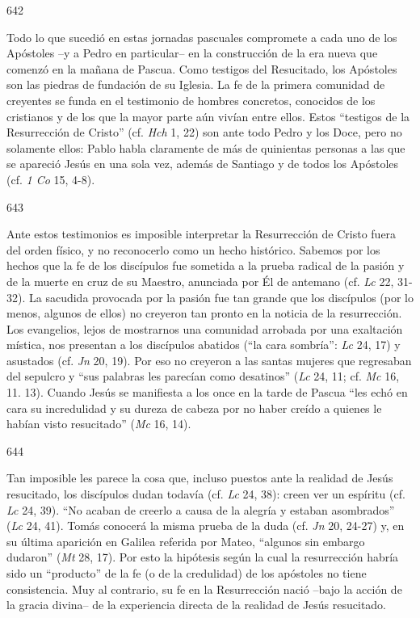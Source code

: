 			\begin{ccebody}\begin{ccenumber}642\end{ccenumber} Todo lo que sucedió en estas jornadas pascuales compromete a cada uno de los Apóstoles –y a Pedro en particular– en la construcción de la era nueva que comenzó en la mañana de Pascua. Como testigos del Resucitado, los Apóstoles son las piedras de fundación de su Iglesia. La fe de la primera comunidad de creyentes se funda en el testimonio de hombres concretos, conocidos de los cristianos y de los que la mayor parte aún vivían entre ellos. Estos “testigos de la Resurrección de Cristo” (cf. \textit{Hch} 1, 22) son ante todo Pedro y los Doce, pero no solamente ellos: Pablo habla claramente de más de quinientas personas a las que se apareció Jesús en una sola vez, además de Santiago y de todos los Apóstoles (cf. \textit{1 Co} 15, 4-8).\end{ccebody}
			
			\begin{ccebody}\begin{ccenumber}643\end{ccenumber} Ante estos testimonios es imposible interpretar la Resurrección de Cristo fuera del orden físico, y no reconocerlo como un hecho histórico. Sabemos por los hechos que la fe de los discípulos fue sometida a la prueba radical de la pasión y de la muerte en cruz de su Maestro, anunciada por Él de antemano (cf. \textit{Lc} 22, 31-32). La sacudida provocada por la pasión fue tan grande que los discípulos (por lo menos, algunos de ellos) no creyeron tan pronto en la noticia de la resurrección. Los evangelios, lejos de mostrarnos una comunidad arrobada por una exaltación mística, nos presentan a los discípulos abatidos (“la cara sombría”: \textit{Lc} 24, 17) y asustados (cf. \textit{Jn} 20, 19). Por eso no creyeron a las santas mujeres que regresaban del sepulcro y “sus palabras les parecían como desatinos” (\textit{Lc} 24, 11; cf. \textit{Mc} 16, 11. 13). Cuando Jesús se manifiesta a los once en la tarde de Pascua “les echó en cara su incredulidad y su dureza de cabeza por no haber creído a quienes le habían visto resucitado” (\textit{Mc} 16, 14).\end{ccebody}
			
			\begin{ccebody}\begin{ccenumber}644\end{ccenumber} Tan imposible les parece la cosa que, incluso puestos ante la realidad de Jesús resucitado, los discípulos dudan todavía (cf. \textit{Lc} 24, 38): creen ver un espíritu (cf. \textit{Lc} 24, 39). “No acaban de creerlo a causa de la alegría y estaban asombrados” (\textit{Lc} 24, 41). Tomás conocerá la misma prueba de la duda (cf. \textit{Jn} 20, 24-27) y, en su última aparición en Galilea referida por Mateo, “algunos sin embargo dudaron” (\textit{Mt} 28, 17). Por esto la hipótesis según la cual la resurrección habría sido un “producto” de la fe (o de la credulidad) de los apóstoles no tiene consistencia. Muy al contrario, su fe en la Resurrección nació –bajo la acción de la gracia divina– de la experiencia directa de la realidad de Jesús resucitado.\end{ccebody}
			
